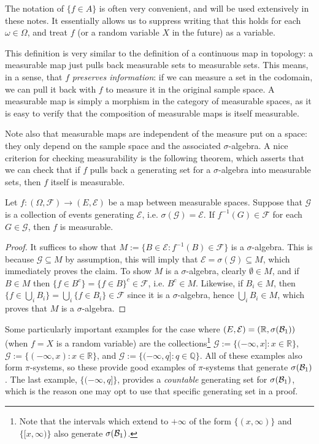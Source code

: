 The notation of $\{f\in A\}$ is often very convenient, and will be used extensively in these notes. It essentially allows us to suppress writing that this holds for each $\omega\in\Omega$, and treat $f$ (or a random variable $X$ in the future) as a variable. 

This definition is very similar to the definition of a continuous map in topology: a measurable map just pulls back measurable sets to measurable sets. This means, in a sense, that $f$ \textit{preserves information}: if we can measure a set in the codomain, we can pull it back with $f$ to measure it in the original sample space. A measurable map is simply a morphism in the category of measurable spaces, as it is easy to verify that the composition of measurable maps is itself measurable. 

Note also that measurable maps are independent of the measure put on a space: they only depend on the sample space and the associated $\sigma$-algebra. A nice criterion for checking measurability is the following theorem, which asserts that we can check that if $f$ pulls back a generating set for a $\sigma$-algebra into measurable sets, then $f$ itself is measurable. 

\begin{theorem}
	Let $f : (\Omega, \mathcal F)\rightarrow (E, \mathcal E)$ be a map between measurable spaces. Suppose that $\mathcal G$ is a collection of events generating $\mathcal E$, i.e. $\sigma(\mathcal G) = \mathcal E$. If $f^{-1}(G)\in\mathcal F$ for each $G\in\mathcal G$, then $f$ is measurable.
\end{theorem}

\begin{proof}
	It suffices to show that $M := \{B\in\mathcal E : f^{-1}(B)\in\mathcal F\}$ is a $\sigma$-algebra. This is because $\mathcal G\subseteq M$ by assumption, this will imply that $\mathcal E = \sigma(\mathcal G)\subseteq M$, which immediately proves the claim. To show $M$ is a $\sigma$-algebra, clearly $\emptyset\in M$, and if $B\in M$ then $\{f\in B^c\} = \{f\in B\}^c\in \mathcal F$, i.e. $B^c\in M$. Likewise, if $B_i\in M$, then $\{f\in\bigcup_i B_i\} = \bigcup_i \{f\in B_i\}\in \mathcal F$ since it is a $\sigma$-algebra, hence $\bigcup_i B_i\in M$, which proves that $M$ is a $\sigma$-algebra. 
\end{proof}

Some particularly important examples for the case where $(E, \mathcal E) = (\mathbb R, \sigma(\mathcal{B}_{1}))$ (when $f = X$ is a random variable) are the collections\footnote{Note that the intervals which extend to $+\infty$ of the form $\{(x, \infty)\}$ and $\{[x, \infty)\}$ also generate $\sigma(\mathcal{B}_{1})$.} $\mathcal G := \{(-\infty, x] : x\in\mathbb R\}$, $\mathcal G := \{(-\infty, x) : x\in\mathbb R\}$, and $\mathcal G := \{(-\infty, q] : q\in\mathbb Q\}$. All of these examples also form $\pi$-systems, so these provide good examples of $\pi$-systems that generate $\sigma(\mathcal{B}_{1})$. The last example, $\{(-\infty, q]\}$, provides a \textit{countable} generating set for $\sigma(\mathcal{B}_{1})$, which is the reason one may opt to use that specific generating set in a proof. 

